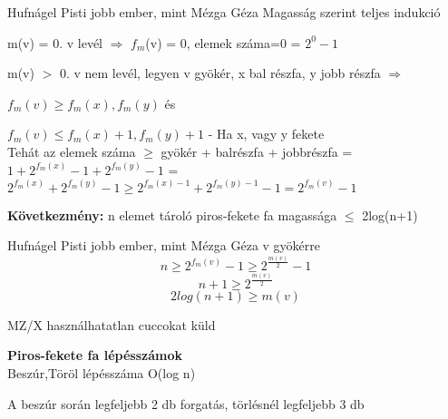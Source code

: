 \begin{bizonyitas}{Hufnágel Pisti jobb ember, mint Mézga Géza}
 Magasság szerint teljes indukció

	 m(v) = 0. v levél $\Rightarrow$ $f_m$(v) = 0, elemek száma=0 = $2^0 - 1$

	 m(v) $>$ 0. v nem levél, legyen v gyökér, x bal részfa, y jobb részfa $\Rightarrow$

	 $f_m(v) \geq f_m(x), f_m(y)$ és

	 $f_m(v) \leq f_m(x) + 1, f_m(y)+ 1$ - Ha x, vagy y fekete \\[0pt]

	 Tehát az elemek száma $\geq$ gyökér + balrészfa + jobbrészfa = $ 1 + 2^{f_m(x)} - 1 + 2^{f_m(y)} -1$ = $ 2^{f_m(x)} + 2^{f_m(y)} -1 \geq 2^{f_m(x) -1}+ 2^{f_m(y) - 1} -1 = 2^{f_m(v)} -1$ %

	 \textbf{Következmény:} n elemet tároló piros-fekete fa magassága $\leq$ 2log(n+1)
\end{bizonyitas}

\begin{bizonyitas}{Hufnágel Pisti jobb ember, mint Mézga Géza}
 v gyökérre $$n \geq 2^{f_m(v)} -1 \geq 2^{\frac{m(v)}{2}} -1$$
	 $$n + 1 \geq 2^{\frac{m(v)}{2}}$$
	 $$2 log(n+1) \geq m(v)$$
\end{bizonyitas}

	 \begin{tetel}{MZ/X használhatatlan cuccokat küld}

    \textbf{Piros-fekete fa lépésszámok} \\[3pt]
	 Beszúr,Töröl lépésszáma O(log n)

	 A beszúr során legfeljebb 2 db forgatás, törlésnél legfeljebb 3 db\\[4pt]
   \end{tetel}

	 \notBiz
